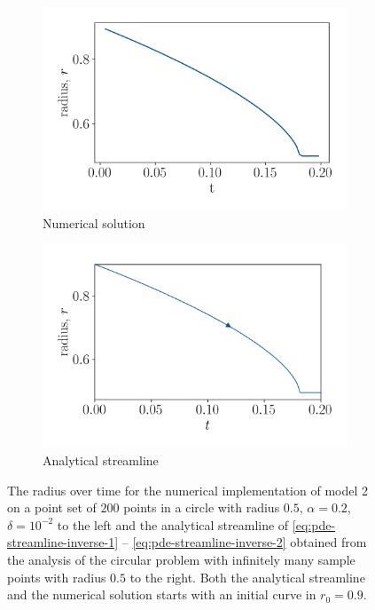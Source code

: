 \begin{figure}
    \centering
    \begin{subfigure}[h]{0.49\textwidth}
        \centering
        \includegraphics[width=\linewidth]{figures/Results/Circle/model2/circlepoints-a02-rad.png}
        \caption{Numerical solution}
        \label{fig:m2-circle-numerical-radius}
    \end{subfigure}%
    \begin{subfigure}[h]{0.49\textwidth}
        \centering
        \includegraphics[width=\linewidth]{figures/Circle-radii/mod2-r09.png}
        \caption{Analytical streamline}
        \label{fig:m2-circle-analytical-radius}
    \end{subfigure}
    \caption[Model 2 - Circle, Radius]{The radius over time for the numerical implementation of model 2 on a point set of $200$ points in a circle with radius $0.5$, $\alpha=0.2$, $\delta=10^{-2}$ to the left and the analytical streamline of \eqref{eq:pde-streamline-inverse-1} -- \eqref{eq:pde-streamline-inverse-2} obtained from the analysis of the circular problem with infinitely many sample points with radius $0.5$ to the right. Both the analytical streamline and the numerical solution starts with an initial curve in $r_0=0.9$.}
    \label{fig:m2-circle-radius-numanal}
\end{figure}

